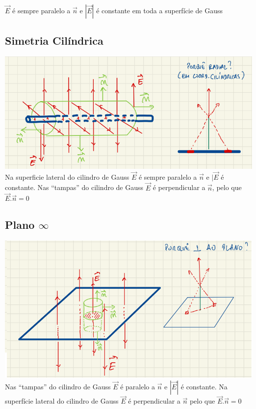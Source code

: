 \documentclass[a4paper]{article}
\begin{document}
$\vec{E}$ é sempre paralelo a $\vec{n}$ e $|\vec{E}|$ é constante em toda a superfície de Gauss
\subsection{Simetria Cilíndrica}
\includegraphics[width = \textwidth]{simetria_cilindrica.png}
Na superficie lateral do cilindro de Gauss $\vec{E}$ é sempre paralelo a $\vec{n}$ e $|\vec{E}$ é constante.
Nas ``tampas'' do cilindro de Gauss $\vec{E}$ é perpendicular a $\vec{n}$, pelo que $\vec{E}.\vec{n}=0$
\subsection{Plano \texorpdfstring{$\infty$}{Infinito}}
\includegraphics[width = \textwidth]{plano_infinito.png}
Nas ``tampas'' do cilindro de Gauss $\vec{E}$ é paralelo a $\vec{n}$ e $|\vec{E}|$ é constante.
Na superfície lateral do cilindro de Gauss $\vec{E}$ é perpendicular a $\vec{n}$ pelo que $\vec{E}.\vec{n} = 0$
\end{document}
